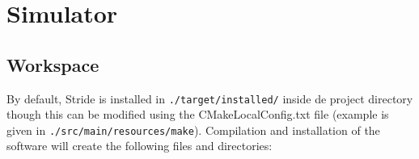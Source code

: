 \chapter{Simulator}
\label{chap:simulator}


\section{Workspace}

By default, Stride is installed in \texttt{./target/installed/} inside de project directory though this can be modified using the CMakeLocalConfig.txt file (example is given in \texttt{./src/main/resources/make}). 
Compilation and installation of the software will create the following files and directories:

